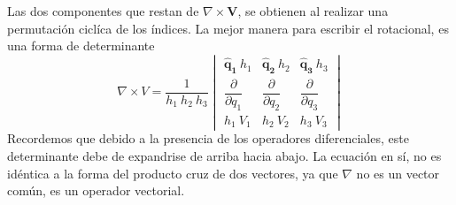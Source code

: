 Las dos componentes que restan de $\nabla \times \mathbf{V}$, se obtienen al realizar una permutación ciclíca de los índices. La mejor manera para escribir el rotacional, es una forma de determinante
\begin{equation}
\nabla \times V = \dfrac{1}{h_{1} \: h_{2} \:h_{3}} \begin{vmatrix}
\mathbf{\widehat{q}_{1}} \: h_{1} & \mathbf{\widehat{q}_{2}} \: h_{2} & \mathbf{\widehat{q}_{3}} \: h_{3} \\[1em]
\dfrac{\partial}{\partial q_{1}} &  \dfrac{\partial}{\partial q_{2}} & \dfrac{\partial}{\partial q_{3}} \\[1em]
h_{1} \: V_{1} & h_{2} \: V_{2} & h_{3} \: V_{3}
\end{vmatrix}
\end{equation}
Recordemos que debido a la presencia de los operadores diferenciales, este determinante debe de expandrise de arriba hacia abajo. La ecuación en sí, no es idéntica a la forma del producto cruz de dos vectores, ya que $\nabla$ no es un vector común, es un operador vectorial.

